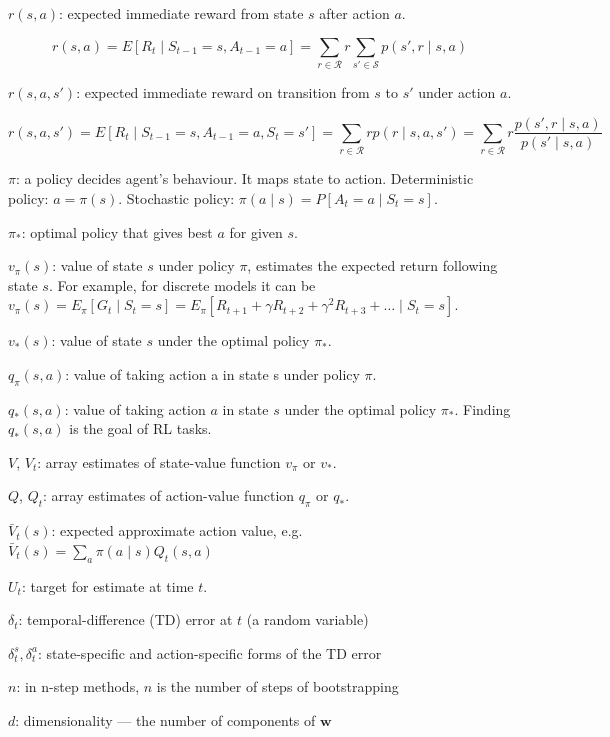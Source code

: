 \documentclass{article}
\begin{document}
\(r(s, a)\): expected immediate reward from state \(s\) after action \(a\).

\[r(s, a) = E[R_t \mid S_{t - 1} = s , A_{t - 1} = a] = \sum_{r \in \mathcal{R}} r \sum_{s' \in \mathcal{S}} p(s', r \mid s, a)\]

\(r(s, a, s')\): expected immediate reward on transition from \(s\) to \(s'\) under action \(a\).

\[r(s, a, s') = E[R_t \mid S_{t - 1} = s , A_{t - 1} = a, S_t = s'] = \sum_{r \in \mathcal{R}} r p(r \mid s, a, s') = \sum_{r \in \mathcal{R}} r \frac{p(s', r \mid s, a)}{p(s' \mid s, a)}\]

\(\pi\): a policy decides agent's behaviour. It maps state to action. 
Deterministic policy: \(a = \pi(s)\). 
Stochastic policy: \(\pi(a \mid s) = P[A_t = a \mid S_t = s]\).

\(\pi_*\): optimal policy that gives best \(a\) for given \(s\).

\(v_{\pi}(s)\): value of state \(s\) under policy \(\pi\), estimates the expected return following state \(s\). 
For example, for discrete models it can be \(v_{\pi}(s) = E_{\pi}[G_t \mid S_t = s] = E_{\pi}[R_{t + 1} + \gamma R_{t + 2} + \gamma^2 R_{t + 3} + \dots \mid S_t = s]\).

\(v_{*}(s)\): value of state \(s\) under the optimal policy \(\pi_*\).

\(q_{\pi}(s, a)\): value of taking action a in state s under policy \(\pi\).

\(q_{*}(s, a)\): value of taking action \(a\) in state \(s\) under the optimal policy \(\pi_*\). Finding \(q_{*}(s, a)\) is the goal of RL tasks.

\(V\), \(V_t\): array estimates of state-value function \(v_{\pi}\) or \(v_{*}\).

\(Q\), \(Q_t\): array estimates of action-value function \(q_{\pi}\) or \(q_{*}\).

\(\bar{V}_{t}(s)\): expected approximate action value, e.g. \(\bar{V}_{t}(s) = \sum_a \pi(a \mid s) Q_t(s, a)\)

\(U_t\): target for estimate at time \(t\).

$\delta _ { t }$: temporal-difference (TD) error at $t$ (a random variable)

$\delta _ { t } ^ { s } , \delta _ { t } ^ { a }$: state-specific and action-specific forms of the TD error

$n$: in n-step methods, $n$ is the number of steps of bootstrapping

$d$: dimensionality — the number of components of $\mathbf { w }$
\end{document}
